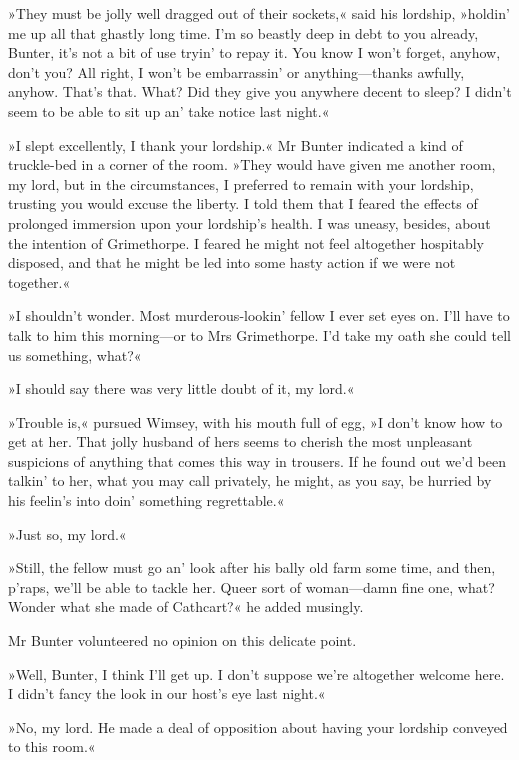 »They must be jolly well dragged out of their sockets,« said his lordship, »holdin' me up all that ghastly long time. I'm so beastly deep in debt to you already, Bunter, it's not a bit of use tryin' to repay it. You know I won't forget, anyhow, don't you? All right, I won't be embarrassin' or anything\allowbreak---\allowbreak thanks awfully, anyhow. That's that.  What? Did they give you anywhere decent to sleep? I didn't seem to be able to sit up an' take notice last night.«

»I slept excellently, I thank your lordship.« Mr Bunter indicated a kind of truckle-bed in a corner of the room. »They would have given me another room, my lord, but in the circumstances, I preferred to remain with your lordship, trusting you would excuse the liberty. I told them that I feared the effects of prolonged immersion upon your lordship's health. I was uneasy, besides, about the intention of Grimethorpe. I feared he might not feel altogether hospitably disposed, and that he might be led into some hasty action if we were not together.«

»I shouldn't wonder. Most murderous-lookin' fellow I ever set eyes on.  I'll have to talk to him this morning\allowbreak---\allowbreak or to Mrs Grimethorpe. I'd take my oath she could tell us something, what?«

»I should say there was very little doubt of it, my lord.«

»Trouble is,« pursued Wimsey, with his mouth full of egg, »I don't know how to get at her. That jolly husband of hers seems to cherish the most unpleasant suspicions of anything that comes this way in trousers. If he found out we'd been talkin' to her, what you may call privately, he might, as you say, be hurried by his feelin's into doin' something regrettable.«

»Just so, my lord.«

»Still, the fellow must go an' look after his bally old farm some time, and then, p'raps, we'll be able to tackle her. Queer sort of woman\allowbreak---\allowbreak damn fine one, what? Wonder what she made of Cathcart?« he added musingly.

Mr Bunter volunteered no opinion on this delicate point.

»Well, Bunter, I think I'll get up. I don't suppose we're altogether welcome here. I didn't fancy the look in our host's eye last night.«

»No, my lord. He made a deal of opposition about having your lordship conveyed to this room.«

